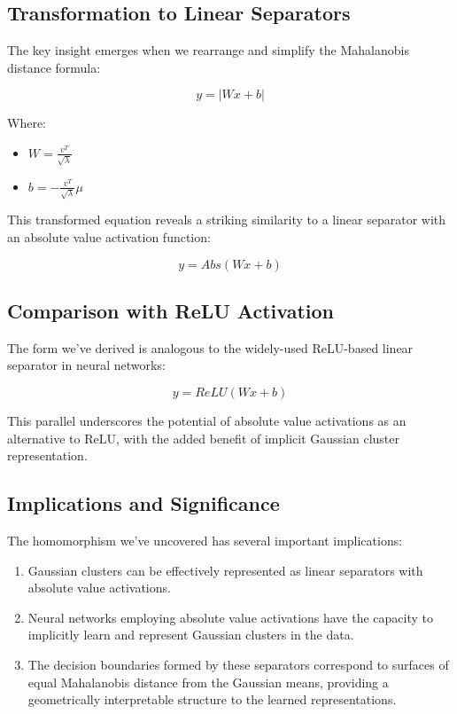 \documentclass[11pt]{article}
\begin{document}
\subsection{Transformation to Linear Separators}

The key insight emerges when we rearrange and simplify the Mahalanobis distance formula:

\begin{equation}
y = |Wx + b|
\end{equation}

Where:

\begin{itemize}
\item $W = \frac{v^T}{\sqrt{\lambda}}$
\item $b = -\frac{v^T}{\sqrt{\lambda}}\mu$
\end{itemize}

This transformed equation reveals a striking similarity to a linear separator with an absolute value activation function:

\begin{equation}
y = Abs(Wx + b)
\end{equation}

\subsection{Comparison with ReLU Activation}

The form we've derived is analogous to the widely-used ReLU-based linear separator in neural networks:

\begin{equation}
y = ReLU(Wx + b)
\end{equation}

This parallel underscores the potential of absolute value activations as an alternative to ReLU, with the added benefit of implicit Gaussian cluster representation.

\subsection{Implications and Significance}

The homomorphism we've uncovered has several important implications:

\begin{enumerate}
\item Gaussian clusters can be effectively represented as linear separators with absolute value activations.
\item Neural networks employing absolute value activations have the capacity to implicitly learn and represent Gaussian clusters in the data.
\item The decision boundaries formed by these separators correspond to surfaces of equal Mahalanobis distance from the Gaussian means, providing a geometrically interpretable structure to the learned representations.
\end{enumerate}
\end{document}
